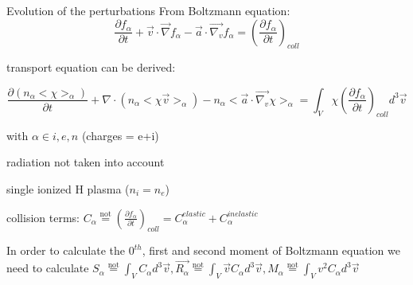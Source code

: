 \documentclass{beamer}
\begin{document}
\begin{frame}{Evolution of the perturbations}
From Boltzmann equation:
\begin{equation}
\frac{\partial f_{\alpha} }{\partial t} + \vec{v} \cdot \vec{\nabla}  f_{\alpha} - \vec{a} \cdot \vec{\nabla_v} f_{\alpha} = (\frac{\partial f_{\alpha}}{\partial t})_{coll}
\end{equation}

transport equation can be derived:

\begin{equation}
\frac{\partial (n_{\alpha} <\chi>_{\alpha})}{\partial t} + \nabla \cdot (n_{\alpha} <\chi \vec{v}>_{\alpha} ) - n_{\alpha}<\vec{a} \cdot \vec{\nabla_v} \chi>_{\alpha} = \int_V{\chi (\frac{\partial f_{\alpha}}{\partial t})_{coll} d^3\vec{v} }
\end{equation}

with $\alpha \in {i,e,n}$ (charges = e+i)

radiation not taken into account

single ionized H plasma ($n_i = n_e$)

collision terms: $C_{\alpha} \stackrel{\text{not}}{=}  (\frac{\partial f_{\alpha}}{\partial t})_{coll} = C_{\alpha}^{elastic} + C_{\alpha}^{inelastic}$

In order to calculate the $0^{th}$, first and second moment of Boltzmann equation we need to calculate $S_\alpha \stackrel{\text{not}}{=} \int_V{C_\alpha d^3\vec{v}}, \vec{R_\alpha} \stackrel{\text{not}}{=} \int_V{\vec{v} C_\alpha d^3\vec{v}},M_\alpha \stackrel{\text{not}}{=}  \int_V{v^2 C_\alpha d^3\vec{v}}$

\end{frame}
\end{document}
